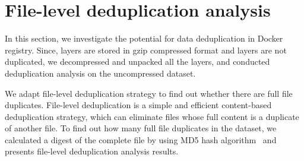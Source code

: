 \section{File-level deduplication analysis}
\label{sec:redundant_files}



In this section, we
investigate the potential for data deduplication in Docker registry. 
Since, layers are stored in gzip compressed format and layers are not
duplicated, we decompressed and unpacked all the layers, and conducted
deduplication analysis on the uncompressed dataset.
 
We adapt file-level deduplication strategy to find out whether
there are full file duplicates.%
File-level deduplication is a simple and efficient content-based deduplication
strategy, which can eliminate files whose full content is a duplicate of
another file. To find out how many full file duplicates in the dataset, we
calculated a digest of the complete file by using MD5 hash algorithm~\cite{xxx} and
presents file-level deduplication analysis results.
%



